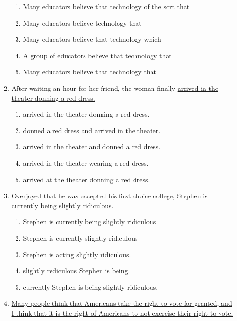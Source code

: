 \begin{enumerate}
\begin{enumerate}[label=(\Alph*)]
\bigskip
\begin{enumerate}[label=(\Alph*)]
\item Many educators believe that technology of the sort that \hrulefill
\item Many educators believe technology that \hrulefill
\item Many educators believe that technology which \hrulefill
\item A group of educators believe that technology that \hrulefill
\item Many educators believe that technology that \hrulefill
\end{enumerate}

\bigskip
\item After waiting an hour for her friend, the woman finally \ul{arrived in the theater donning a red dress.}

\bigskip
\begin{enumerate}[label=(\Alph*)]
\item arrived in the theater donning a red dress.\hrulefill
\item donned a red dress and arrived in the theater. \hrulefill
\item arrived in the theater and donned a red dress. \hrulefill
\item arrived in the theater wearing a red dress.\hrulefill
\item arrived at the theater donning a red dress.\hrulefill
\end{enumerate}

\bigskip
\item Overjoyed that he was accepted his first choice college, \ul{Stephen is currently being slightly ridiculous.}

\bigskip
\begin{enumerate}[label=(\Alph*)]
\item Stephen is currently being slightly ridiculous \hrulefill
\item Stephen is currently slightly ridiculous\hrulefill
\item Stephen is acting slightly ridiculous.\hrulefill
\item slightly rediculous Stephen is being. \hrulefill
\item currently Stephen is being slightly ridiculous.\hrulefill
\end{enumerate}

\bigskip
\item \ul{Many people think that Americans take the right to vote for granted, and I think that it is the right of Americans to not exercise their right to vote.}


\end{enumerate}
\end{enumerate}
